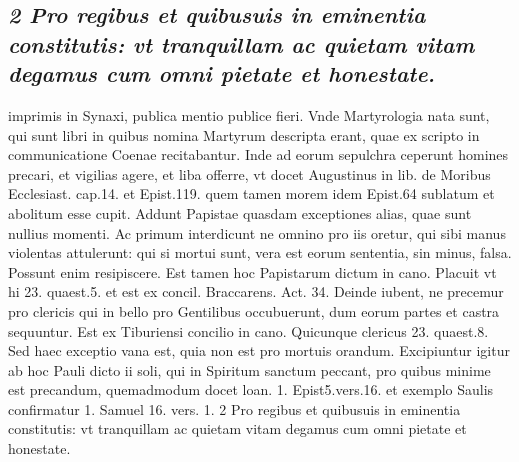 \documentclass{article}
\begin{document}
\begin{pages}
\subsection*{\textit{2 Pro regibus et quibusuis in eminentia constitutis: vt tranquillam ac quietam vitam degamus cum omni pietate et honestate.}}imprimis in Synaxi, publica mentio publice fieri. Vnde Martyrologia nata sunt, qui sunt libri in quibus nomina Martyrum descripta erant, quae ex scripto in communicatione Coenae recitabantur. Inde ad eorum sepulchra ceperunt homines precari, et vigilias agere, et liba offerre, vt docet Augustinus in lib.  de Moribus Ecclesiast. cap.14. et Epist.119. quem tamen morem idem Epist.64 sublatum et abolitum esse cupit. Addunt Papistae quasdam exceptiones alias, quae sunt nullius momenti. Ac primum interdicunt ne omnino pro iis oretur, qui sibi manus violentas attulerunt: qui si mortui sunt, vera est eorum sententia, sin minus, falsa. Possunt enim resipiscere. Est tamen hoc Papistarum dictum in cano. Placuit vt hi 23. quaest.5. et est ex concil. Braccarens. Act. 34. Deinde iubent, ne precemur pro clericis qui in bello pro Gentilibus occubuerunt, dum eorum partes et castra sequuntur. Est ex Tiburiensi concilio in cano. Quicunque clericus 23. quaest.8. Sed haec exceptio vana est, quia non est pro mortuis orandum. Excipiuntur igitur ab hoc Pauli dicto ii soli, qui in Spiritum sanctum peccant, pro quibus minime est precandum, quemadmodum docet loan. 1. Epist5.vers.16. et exemplo Saulis confirmatur 1. Samuel 16. vers. 1. 2 Pro regibus et quibusuis in eminentia constitutis: vt tranquillam ac quietam vitam degamus cum omni pietate et honestate.  \pend

\end{pages}
\end{document}
